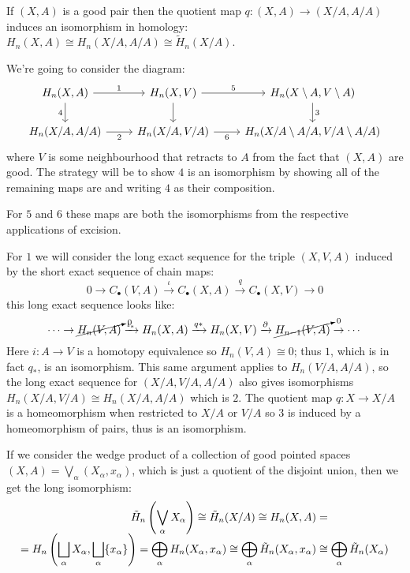 \documentclass[a4paper]{article}
\begin{document}
\begin{proposition}
    If $(X,A)$ is a good pair then the quotient map $q:(X,A)\rightarrow(X/A,A/A)$ induces an isomorphism in homology: $H_n(X,A)\cong H_n(X/A,A/A) \cong \tilde{H}_n(X/A)$.
    \begin{prf}
        We're going to consider the diagram:
        \[\begin{tikzcd}
            H_n(X,A) \arrow[r, "1"] \arrow[d, "4", swap] & H_n(X,V) \arrow[r, "5"] \arrow[d] & H_n(X\setminus A, V\setminus A) \arrow[d, "3"]\\
            H_n(X/A,A/A) \arrow[r, "2", swap] & H_n(X/A,V/A) \arrow[r, "6", swap] & H_n(X/A\setminus A/A, V/A\setminus A/A)
        \end{tikzcd}\]
        where $V$ is some neighbourhood that retracts to $A$ from the fact that $(X,A)$ are good. The strategy will be to show $4$ is an isomorphism by showing all of the remaining maps are and writing $4$ as their composition.
        
        For $5$ and $6$ these maps are both the isomorphisms from the respective applications of excision.

        For $1$ we will consider the long exact sequence for the triple $(X,V,A)$ induced by the short exact sequence of chain maps: \[
        0\rightarrow C_\bullet(V,A) \xrightarrow{\iota} C_\bullet(X,A) \xrightarrow{q} C_\bullet(X,V) \rightarrow 0
        \]
        this long exact sequence looks like: \[
        \cdots\rightarrow \cancelto{_0}{H_n(V,A)} \xrightarrow{\iota_*} H_n(X,A) \xrightarrow{q*} H_n(X,V) \xrightarrow{\partial} \cancelto{_0}{H_{n-1}(V,A)} \rightarrow \cdots
        \] %
        Here $i:A\rightarrow V$ is a homotopy equivalence so $H_n(V,A)\cong 0$; thus $1$, which is in fact $q_*$, is an isomorphism. This same argument applies to $H_n(V/A,A/A)$, so the long exact sequence for $(X/A,V/A,A/A)$ also gives isomorphisms $H_n(X/A,V/A)\cong H_n(X/A,A/A)$ which is $2$. The quotient map $q:X\rightarrow X/A$ is a homeomorphism when restricted to $X/A$ or $V/A$ so $3$ is induced by a homeomorphism of pairs, thus is an isomorphism.
    \end{prf}
\end{proposition}
If we consider the wedge product of a collection of good pointed spaces $(X,A)=\bigvee_\alpha(X_\alpha,x_\alpha)$, which is just a quotient of the disjoint union, then we get the long isomorphism: 
\begin{align*}
    \tilde{H}_n\left( \bigvee_\alpha X_\alpha \right) \cong \tilde{H}_n(X/A)\cong H_n(X,A) &= \\[-5pt]
    = H_n\left( \bigsqcup_\alpha X_\alpha,\bigsqcup_\alpha\{x_\alpha\} \right) = \bigoplus_\alpha H_n(X_\alpha,x_\alpha)\cong \bigoplus_\alpha \tilde{H}_n(X_\alpha,x_\alpha) &\cong \bigoplus_\alpha\tilde{H}_n(X_\alpha)
\end{align*}
\end{document}
